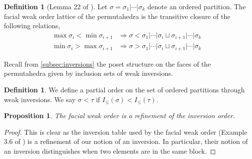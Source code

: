 \documentclass{amsart}
\newcommand{\Kurt}[1]{\todo[color=orange!30]{\rm #1 \\ \hfill --- K.}}
\newtheorem{proposition}[theorem]{Proposition}
\theoremstyle{definition}
\newtheorem{definition}[theorem]{Definition}
\renewcommand{\implies}{\Rightarrow} %
\begin{document}
\begin{definition}[Lemma 22 of \cite{palacios2004weak}]
Let $\sigma = \sigma_1|\cdots|\sigma_k$ denote an ordered partition.
The facial weak order lattice of the permutahedra is the transitive closure of the following relations,
\begin{align}
    \max \sigma_i < \min \sigma_{i+1} &\implies \sigma < \sigma_1|\cdots|\sigma_i \sqcup \sigma_{i+1}|\cdots|\sigma_k  \label{eq:Weak Facial 1}\\
    \min \sigma_i > \max \sigma_{i+1} &\implies \sigma > \sigma_1|\cdots|\sigma_i \sqcup \sigma_{i+1}|\cdots|\sigma_k \label{eq:Weak Facial 2}
\end{align}
\end{definition}

Recall from \cref{subsec:inversions} the poset structure on the faces of the permutahedra given by inclusion sets of weak inversions. 

\begin{definition}
We define a partial order on the set of ordered partitions through weak inversions.
We say $\sigma<\tau$ if $I_{\leq}(\sigma)<I_{\leq}(\tau)$. 
\end{definition}

\begin{proposition}
The facial weak order is a refinement\Kurt{check correct term} of the inversion order.
\end{proposition}
\begin{proof}
This is clear as the inversion table used by the facial weak order (Example 3.6 of \cite{dermenjian2018facial}) is a refinement of our notion of an inversion.
In particular, their notion of an inversion distinguishes when two elements are in the same block.
\end{proof}
\end{document}
